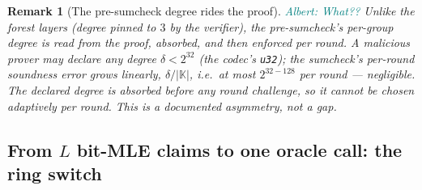 \documentclass[11pt]{article}
\newcommand{\K}{\mathbb{K}}            %
\newcommand{\albert}[1]{\textcolor{teal}{Albert: {#1}}}
\newcommand{\code}[1]{{\def\_{\textunderscore\allowbreak}\texttt{#1}}}
\newtheorem{remark}{Remark}
\begin{document}
\begin{remark}[The pre-sumcheck degree rides the proof]
\label{rem:degree}
\albert{What??}
Unlike the forest layers (degree pinned to $3$ by the verifier), the
pre-sumcheck's per-group degree is read from the proof, absorbed, and then
enforced per round.  A malicious prover may declare any degree
$\delta < 2^{32}$ (the codec's \code{u32}); the sumcheck's per-round
soundness error grows linearly, $\delta / |\K|$, i.e.\ at most
$2^{32-128}$ per round — negligible.  The declared degree is absorbed
before any round challenge, so it cannot be chosen adaptively per round.
This is a documented asymmetry, not a gap.
\end{remark}

\subsection{From $L$ bit-MLE claims to one oracle call: the ring switch}
\end{document}
